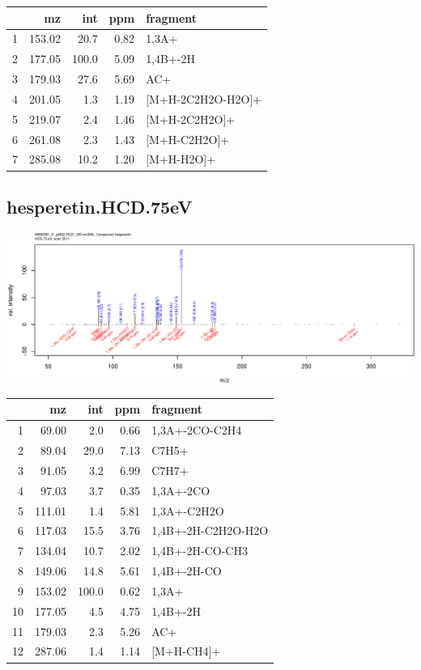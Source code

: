 \documentclass[]{article}
\begin{document}
\begin{table}[ht]
\centering
\begin{tabular}{rrrrl}
  \toprule
 & mz & int & ppm & fragment \\ 
  \midrule
1 & 153.02 & 20.7 & 0.82 & 1,3A+ \\ 
  2 & 177.05 & 100.0 & 5.09 & 1,4B+-2H \\ 
  3 & 179.03 & 27.6 & 5.69 & AC+ \\ 
  4 & 201.05 & 1.3 & 1.19 & [M+H-2C2H2O-H2O]+ \\ 
  5 & 219.07 & 2.4 & 1.46 & [M+H-2C2H2O]+ \\ 
  6 & 261.08 & 2.3 & 1.43 & [M+H-C2H2O]+ \\ 
  7 & 285.08 & 10.2 & 1.20 & [M+H-H2O]+ \\ 
   \bottomrule
\end{tabular}
\end{table}

\clearpage\subsection{hesperetin.HCD.75eV}
\includegraphics[width=\textwidth]{WEB350_files/figure-latex/unnamed-chunk-3-8}

\begin{table}[ht]
\centering
\begin{tabular}{rrrrl}
  \toprule
 & mz & int & ppm & fragment \\ 
  \midrule
1 & 69.00 & 2.0 & 0.66 & 1,3A+-2CO-C2H4 \\ 
  2 & 89.04 & 29.0 & 7.13 & C7H5+ \\ 
  3 & 91.05 & 3.2 & 6.99 & C7H7+ \\ 
  4 & 97.03 & 3.7 & 0.35 & 1,3A+-2CO \\ 
  5 & 111.01 & 1.4 & 5.81 & 1,3A+-C2H2O \\ 
  6 & 117.03 & 15.5 & 3.76 & 1,4B+-2H-C2H2O-H2O \\ 
  7 & 134.04 & 10.7 & 2.02 & 1,4B+-2H-CO-CH3 \\ 
  8 & 149.06 & 14.8 & 5.61 & 1,4B+-2H-CO \\ 
  9 & 153.02 & 100.0 & 0.62 & 1,3A+ \\ 
  10 & 177.05 & 4.5 & 4.75 & 1,4B+-2H \\ 
  11 & 179.03 & 2.3 & 5.26 & AC+ \\ 
  12 & 287.06 & 1.4 & 1.14 & [M+H-CH4]+ \\ 
   \bottomrule
\end{tabular}
\end{table}
\end{document}

